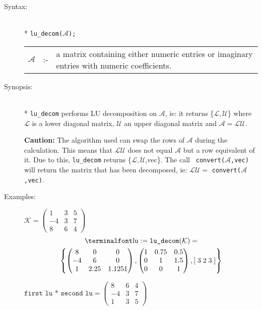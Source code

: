 \begin{description}
\item[Syntax:]\mbox{}\\*
\texttt{lu\_decom($\mathcal{A}$);}\\[2mm]
\begin{tabular}{l l l}
$\mathcal{A}$ &:-& \parbox[t]{.848\linewidth}{a matrix containing either
numeric entries or imaginary entries with numeric coefficients.}
\end{tabular}

\item[Synopsis:]\mbox{}\\*
  \texttt{lu\_decom} performs LU decomposition on $\mathcal{A}$, ie: it returns
  \{$\mathcal{L,U}$\} where $\mathcal{L}$ is a lower diagonal matrix, $\mathcal{U}$ an
  upper diagonal matrix and $\mathcal{A} = \mathcal{LU}$.

\textbf{Caution:}
  The algorithm used can swap the rows of $\mathcal{A}$ during the calculation. This
  means that $\mathcal{LU}$ does not equal $\mathcal{A}$ but a row equivalent of it. Due
  to this, \texttt{lu\_decom} returns \{$\mathcal{L,U}$,vec\}. The call {\tt
  convert($\mathcal{A}$,vec)} will return the matrix that has been decomposed, ie:
  $\mathcal{LU} = $ \texttt{convert($\mathcal{A}$,vec)}.

\item[Examples:]
\(
\mathcal{K} = \begin{pmatrix} 1 & 3 & 5 \\ -4 & 3 & 7 \\ 8 & 6 & 4 \end{pmatrix}
\)
\begin{multline*}
\text{\var{lu}} := \text{\f{lu\_decom}} (\mathcal{K}) = \\
\left\{
        \begin{pmatrix} 8 & 0 & 0 \\ -4 & 6 & 0 \\ 1 & 2.25 & 1.125 1 \end{pmatrix},
        \begin{pmatrix} 1 & 0.75 & 0.5 \\ 0 & 1 & 1.5 \\ 0 & 0 & 1 \end{pmatrix},
	[\; 3 \; 2 \; 3 \; ]
\right\}
\end{multline*}

\(\texttt{first lu * second lu} =
        \begin{pmatrix} 8 & 6 & 4 \\ -4 & 3 & 7 \\ 1 & 3 & 5 \end{pmatrix}\)


\end{description}
